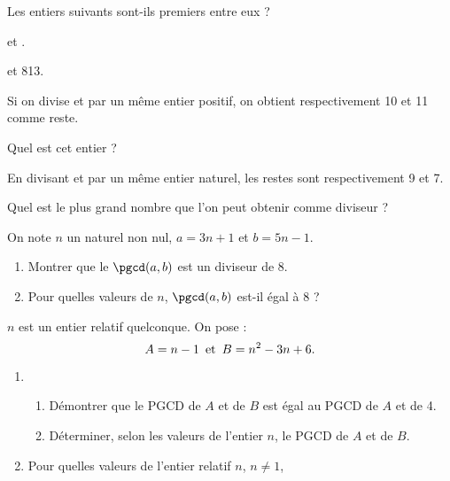 \begin{colonne*exercice}
\begin{exercice}
Les entiers suivants sont-ils premiers entre eux ?
\begin{colenumerate}{2}
\item {} et . 
\item {} et 813.
\end{colenumerate}
\end{exercice}

\begin{exercice}
  Si on divise  et  par un même entier
  positif, on obtient respectivement 10 et 11 comme reste.

  Quel est cet entier ?
\end{exercice}

\begin{exercice}
  En divisant  et  par un même entier
  naturel, les restes sont respectivement 9 et 7. 

  Quel est le plus grand nombre que l’on peut obtenir comme diviseur ?
\end{exercice}

\begin{exercice}
On note $n$ un naturel non nul, $a=3n+1$ et $b=5n-1$.
\begin{enumerate}
\item Montrer que le $\pgcd(a,b)$ est un diviseur de 8.
\item Pour quelles valeurs de $n$, $\pgcd(a,b)$ est-il égal à 8 ?
\end{enumerate}
\end{exercice}

\begin{exercice}
$n$ est un entier relatif quelconque. On pose :\vspace{-10pt}
$$A=n-1\enskip \text{et}\enskip B=n^2-3n+6.\vspace{-5pt}$$
\begin{enumerate}
\item\begin{enumerate}
\item Démontrer que le PGCD de $A$ et de $B$ est égal au PGCD de $A$ et de 4.
\item Déterminer, selon les valeurs de l’entier $n$, le PGCD de $A$ et de $B$.
\end{enumerate}
\item Pour quelles valeurs de l’entier relatif $n$, $n\neq1$,\vspace{5pt}


\end{enumerate}
\end{exercice}
\end{colonne*exercice}
